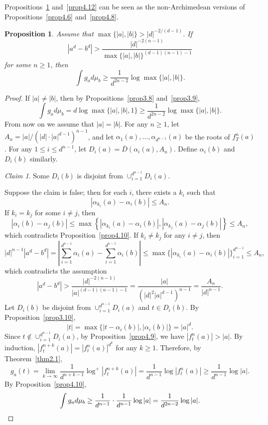 \documentclass[11pt]{amsart}
\numberwithin{equation}{section}
\theoremstyle{plain}
\newtheorem{prop}[thm]{Proposition}
\theoremstyle{definition}
\theoremstyle{remark}
\newtheorem*{claim*}{Claim}
\begin{document}
Propositions~\ref{prop4.11} and~\ref{prop4.12} can be seen as the
non-Archimedean versions of Propositions~\ref{prop4.6} and~\ref{prop4.8}.

\begin{prop}\label{prop4.11}
Assume that $\max\{|a|,|b|\}>|d|^{-2/(d-1)}$. If
\[
|a^{d}-b^{d}|>\frac{|d|^{-2(n-1)}}{\max\{|a|,|b|\}^{(d-1)(n-1)-1}} 
\]
for some $n\geq1$, then
\[
\int g_{a}d\mu_{b}\geq\frac{1}{d^{2n-2}}\log\max\{|a|,|b|\}.
\]
\end{prop}

\begin{proof}
If $|a|\neq|b|$, then by Propositions~\ref{prop3.8} and~\ref{prop3.9},
\[
\int g_{a}d\mu_{b}=d\log\max\{|a|,|b|,1\}\geq\frac{1}{d^{2n-2}}\log\max\{|a|,|b|\}.
\]
From now on we assume that $|a|=|b|$. For any $n\geq1$, let $A_{n}=|a|/(|d|\cdot|a|^{d-1})^{n-1}$,
and let $\alpha_{1}(a),\dots,\alpha_{d^{n-1}}(a)$ be the roots of
$f_{T}^{n}(a)$. For any $1\leq i\leq d^{n-1}$, let $D_{i}(a)=\overline{D}(\alpha_{i}(a),A_{n})$.
Define $\alpha_{i}(b)$ and $D_{i}(b)$ similarly.

\begin{claim*}
  Some $D_{i}(b)$ is disjoint from $\cup_{i=1}^{d^{n-1}}D_{i}(a)$.
\end{claim*}

Suppose the claim is false; then for each $i$, there exists a $k_{i}$ such that
\[
|\alpha_{k_{i}}(a)-\alpha_{i}(b)|\leq A_{n}.
\]
If $k_{i}=k_{j}$ for some $i\neq j$, then
\[
|\alpha_{i}(b)-\alpha_{j}(b)|\leq\max\left\{\left|\alpha_{k_{i}}(a)-\alpha_{i}(b)\right|,\left|\alpha_{k_{j}}(a)-\alpha_{j}(b)\right|\right\}\leq A_{n},
\]
which contradicts Proposition~\ref{prop4.10}. If $k_{i}\neq k_{j}$
for any $i\neq j$, then
\[
|d|^{n-1}\left|a^{d}-b^{d}\right|=\left|\sum_{i=1}^{d^{n-1}}\alpha_{i}(a)-\sum_{i=1}^{d^{n-1}}\alpha_{i}(b)\right|\leq\max\{|\alpha_{k_{i}}(a)-\alpha_{i}(b)|\}_{i=1}^{d^{n-1}}\leq A_{n},
\]
which contradicts the assumption
\[
\left|a^{d}-b^{d}\right|>\frac{|d|^{-2(n-1)}}{|a|^{(d-1)(n-1)-1}}=\frac{|a|}{\left(|d|^{2}|a|^{d-1}\right)^{n-1}}=\frac{A_{n}}{|d|^{n-1}}.
\]
Let $D_{i}(b)$ be disjoint from $\cup_{i=1}^{d^{n-1}}D_{i}(a)$ and
$t\in D_{i}(b)$. By Proposition~\ref{prop3.10},
\[
|t|=\max\{|t-\alpha_{i}(b)|,|\alpha_{i}(b)|\}=|a|^{d}.
\]
Since $t\notin\cup_{i=1}^{d^{n-1}}D_{i}(a)$, by Proposition~\ref{prop4.9},
we have $|f_{t}^{n}(a)|>|a|$. By induction, $|f_{t}^{n+k}(a)|=|f_{t}^{n}(a)|^{d^{k}}$
for any $k\geq1$. Therefore, by Theorem~\ref{thm2.1},
\[
g_{a}(t)=\lim_{k\to\infty}\frac{1}{d^{n+k-1}}\log^{+}\left|f_{t}^{n+k}(a)\right|=\frac{1}{d^{n-1}}\log\left|f_{t}^{n}(a)\right|\geq\frac{1}{d^{n-1}}\log|a|.
\]
By Proposition~\ref{prop4.10},
\[
\int g_{a}d\mu_{b}\geq\frac{1}{d^{n-1}}\cdot\frac{1}{d^{n-1}}\log|a|=\frac{1}{d^{2n-2}}\log|a|.\qedhere
\]
\end{proof}
\end{document}
